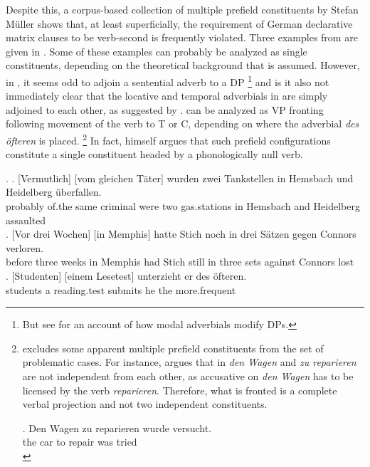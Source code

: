Despite this, a corpus-based collection of multiple prefield constituents by Stefan Müller \citep{muller2002, muller2003, muller2005} shows that, at least superficially, the requirement of German declarative matrix clauses to be verb-second is frequently violated. Three examples from \citet[32, 38, 59]{muller2003} are given in \Next. Some of these examples can probably be analyzed as single constituents, depending on the theoretical background that is assumed. However, in \Last[a], it seems odd to adjoin a sentential adverb to a DP%
%
\footnote{But see \citet{bogal-allbritten2013} for an account of how modal adverbials modify DPs.}\afterfn%
%
and is it also not immediately clear that the locative and temporal adverbials in \Last[b] are simply adjoined to each other, as suggested by \citet{haider2000}. \Last[c] can be analyzed as VP fronting following movement of the verb to T or C, depending on where the adverbial \textit{des öfteren} is placed.%
%
\footnote{
\citeauthor{muller2003} excludes some apparent multiple prefield constituents from the set of problematic cases. For instance, \citet[21]{muller2003} argues that in \Next \textit{den Wagen} and \textit{zu reparieren} are not independent from each other, as accusative on \textit{den Wagen} has to be licensed by the verb \textit{reparieren}. Therefore, what is fronted is a complete verbal projection and not two independent constituents. 

\exg. Den Wagen zu reparieren wurde versucht.\\
      the car to repair was tried\\
       

}\afterfn%
%
In fact, \citet[13--22]{muller2005} himself argues that such prefield configurations constitute a single constituent headed by a phonologically null verb. 

\ex. \ag. [Vermutlich] [vom    gleichen  Täter]    wurden zwei Tankstellen in Hemsbach und Heidelberg überfallen.\\
probably of.the  same criminal were two gas.stations in Hemsbach and Heidelberg assaulted\\
\bg. [Vor drei  Wochen] [in Memphis] hatte Stich noch in drei Sätzen gegen Connors verloren.\\ 
before three weeks    in Memphis  had   Stich  still   in three sets   against Connors lost\\
\cg. [Studenten] [einem Lesetest] unterzieht er des öfteren.\label{ex:muller-vf-doio} \\ 
students a reading.test  submits he the more.frequent\\


